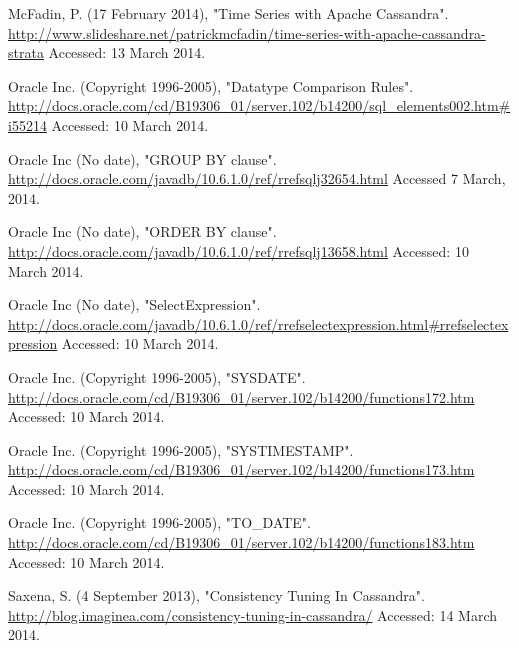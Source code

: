 \documentclass[letterpaper]{article}
\begin{document}
McFadin, P. (17 February 2014), "Time Series with Apache Cassandra".
\url{http://www.slideshare.net/patrickmcfadin/time-series-with-apache-cassandra-strata}
Accessed: 13 March 2014.

Oracle Inc. (Copyright 1996-2005), "Datatype Comparison Rules".
\url{http://docs.oracle.com/cd/B19306_01/server.102/b14200/sql_elements002.htm#i55214}
Accessed: 10 March 2014.

Oracle Inc (No date), "GROUP BY clause".
\url{http://docs.oracle.com/javadb/10.6.1.0/ref/rrefsqlj32654.html}
Accessed 7 March, 2014.

Oracle Inc (No date), "ORDER BY clause".
\url{http://docs.oracle.com/javadb/10.6.1.0/ref/rrefsqlj13658.html}
Accessed: 10 March 2014.

Oracle Inc (No date), "SelectExpression".
\url{http://docs.oracle.com/javadb/10.6.1.0/ref/rrefselectexpression.html#rrefselectexpression}
Accessed: 10 March 2014.

Oracle Inc. (Copyright 1996-2005), "SYSDATE".
\url{http://docs.oracle.com/cd/B19306_01/server.102/b14200/functions172.htm}
Accessed: 10 March 2014.

Oracle Inc. (Copyright 1996-2005), "SYSTIMESTAMP".
\url{http://docs.oracle.com/cd/B19306_01/server.102/b14200/functions173.htm}
Accessed: 10 March 2014.

Oracle Inc. (Copyright 1996-2005), "TO\_DATE".
\url{http://docs.oracle.com/cd/B19306_01/server.102/b14200/functions183.htm}
Accessed: 10 March 2014.

Saxena, S. (4 September 2013), "Consistency Tuning In Cassandra".
\url{http://blog.imaginea.com/consistency-tuning-in-cassandra/}
Accessed: 14 March 2014.
\end{document}
